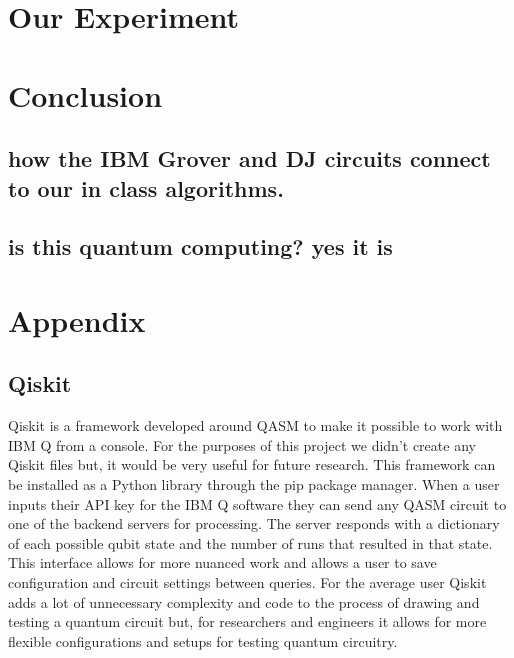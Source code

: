 \documentclass{article}
\begin{document}
\section{Our Experiment}
\section{Conclusion}
\subsection{how the IBM Grover and DJ circuits connect to our in class algorithms.}
\subsection{is this quantum computing? yes it is}

\newpage

\section{Appendix}
\subsection{Qiskit}
        Qiskit is a framework developed around QASM to make it possible to work with IBM Q from a console. For the purposes of this project we didn't create any Qiskit files but, it would be very useful for future research. This framework can be installed as a Python library through the pip package manager. When a user inputs their API key for the IBM Q software they can send any QASM circuit to one of the backend servers for processing. The server responds with a dictionary of each possible qubit state and the number of runs that resulted in that state. This interface allows for more nuanced work and allows a user to save configuration and circuit settings between queries. For the average user Qiskit adds a lot of unnecessary complexity and code to the process of drawing and testing a quantum circuit but, for researchers and engineers it allows for more flexible configurations and setups for testing quantum circuitry.
\end{document}

